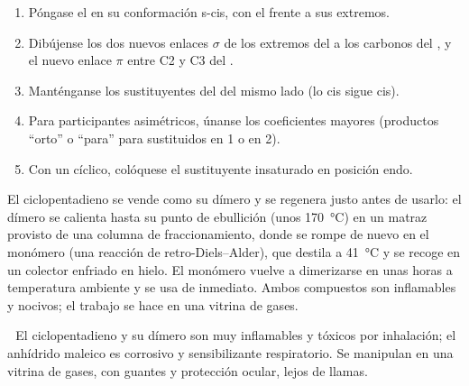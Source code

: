 \begin{method}\label{met:b2:frontier-orbitals:diels-alder}
\begin{enumerate}
  \item Póngase el  en su conformación s-cis, con el  frente a sus extremos.
  \item Dibújense los dos nuevos enlaces $\sigma$ de los extremos del  a los carbonos del ,
        y el nuevo enlace $\pi$ entre C2 y C3 del .
  \item Manténganse los sustituyentes del  del mismo lado (lo cis sigue cis).
  \item Para participantes asimétricos, únanse los coeficientes mayores (productos ``orto'' o ``para''
        para  sustituidos en 1 o en 2).
  \item Con un  cíclico, colóquese el sustituyente insaturado en posición endo.
\end{enumerate}
\end{method}

\begin{inthelab}
El ciclopentadieno se vende como su dímero y se regenera justo antes de usarlo: el dímero se
calienta hasta su punto de ebullición (unos \qty{170}{\degreeCelsius}) en un matraz provisto de una
columna de fraccionamiento, donde se rompe de nuevo en el monómero (una reacción de retro-Diels--Alder),
que destila a \qty{41}{\degreeCelsius} y se recoge en un colector enfriado
en hielo. El monómero vuelve a dimerizarse en unas horas a temperatura ambiente y se usa de
inmediato. Ambos compuestos son inflamables y nocivos; el trabajo se hace en una vitrina de gases.
\end{inthelab}

\begin{safety}{\,\,}
El ciclopentadieno y su dímero son muy inflamables y tóxicos por inhalación; el anhídrido
maleico es corrosivo y sensibilizante respiratorio. Se manipulan en una vitrina de gases,
con guantes y protección ocular, lejos de llamas.
\end{safety}

